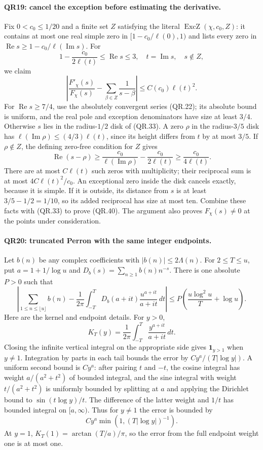 \paragraph{QR19: cancel the exception before estimating the derivative.}
Fix $0<c_0\le1/20$ and a finite set $Z$ satisfying the literal
$\operatorname{ExcZ}(\chi,c_0,Z)$: it contains at most one
real simple zero in $[1-c_0/\ell(0),1)$ and lists every zero
in $\operatorname{Re}s\ge1-c_0/\ell(\operatorname{Im}s)$.
For
\[
 1-\frac{c_0}{2\ell(t)}\le\operatorname{Re}s\le3,
             \quad t=\operatorname{Im}s,\quad s\notin Z,
\]
we claim
\[
 \left|\frac{F'_\chi(s)}{F_\chi(s)}
                         -\sum_{\beta\in Z}\frac1{s-\beta}\right|
                     \le C(c_0)\ell(t)^2.                 \tag{QR.40}
\]
For $\operatorname{Re}s\ge7/4$, use the absolutely convergent
series (QR.22); its absolute bound is uniform, and the real pole
and exception denominators have size at least $3/4$.
Otherwise $s$ lies in the radius-$1/2$ disk of (QR.33).
A zero $\rho$ in the radius-$3/5$ disk has
$\ell(\operatorname{Im}\rho)\le(4/3)\ell(t)$, since its
height differs from $t$ by at most $3/5$. If $\rho\notin Z$,
the defining zero-free condition for $Z$ gives
\[
 \operatorname{Re}(s-\rho)
    \ge\frac{c_0}{\ell(\operatorname{Im}\rho)}
                        -\frac{c_0}{2\ell(t)}
    \ge\frac{c_0}{4\ell(t)}.
\]
There are at most $C\ell(t)$ such zeros with multiplicity;
their reciprocal sum is at most $4C\ell(t)^2/c_0$.
An exceptional zero inside the disk cancels exactly, because it
is simple. If it is outside, its distance from $s$ is at least
$3/5-1/2=1/10$, so its added reciprocal has size at most ten.
Combine these facts with (QR.33) to prove (QR.40). The argument
also proves $F_\chi(s)\ne0$ at the points under consideration.

\paragraph{QR20: truncated Perron with the same integer endpoints.}
Let $b(n)$ be any complex coefficients with $|b(n)|\le2\Lambda(n)$.
For $2\le T\le u$, put $a=1+1/\log u$ and
$D_b(s)=\sum_{n\ge1}b(n)n^{-s}$. There is one absolute $P>0$
such that
\[
 \left|\sum_{1\le n\le\lfloor u\rfloor}b(n)
 -\frac1{2\pi}\int_{-T}^T D_b(a+it)\frac{u^{a+it}}{a+it}\,dt\right|
       \le P\left(\frac{u\log^2u}{T}+\log u\right).       \tag{QR.41}
\]
Here are the kernel and endpoint details. For $y>0$,
\[
 K_T(y)=\frac1{2\pi}\int_{-T}^T\frac{y^{a+it}}{a+it}\,dt.
\]
Closing the infinite vertical integral on the appropriate side gives
$\mathbf1_{y>1}$ when $y\ne1$. Integration by parts in each
tail bounds the error by $C y^a/(T|\log y|)$. A uniform second
bound is $C y^a$: after pairing $t$ and $-t$, the cosine integral
has weight $a/(a^2+t^2)$ of bounded integral, and the sine integral
with weight $t/(a^2+t^2)$ is uniformly bounded by splitting at $a$
and applying the Dirichlet bound to $\sin(t\log y)/t$.
The difference of the latter weight and $1/t$ has bounded integral
on $[a,\infty)$. Thus for $y\ne1$ the error is bounded by
\[
             C y^a\min(1,(T|\log y|)^{-1}).               \tag{QR.42}
\]
At $y=1$, $K_T(1)=\arctan(T/a)/\pi$, so the error from the
full endpoint weight one is at most one.

